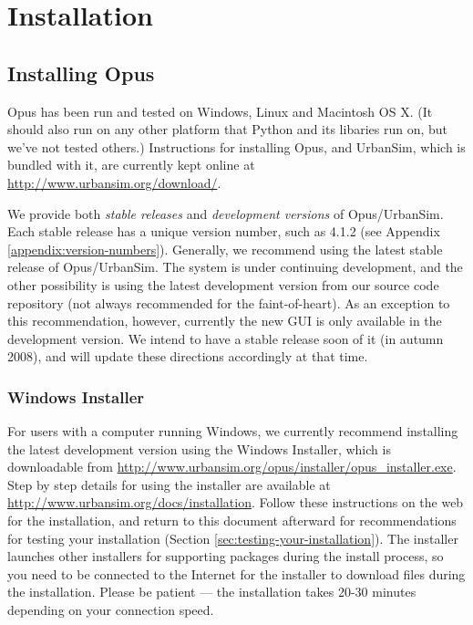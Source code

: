 
\chapter{Installation}
\label{appendix:installation}


\section{Installing Opus}

Opus has been run and tested on Windows, Linux and Macintosh OS X\@.  (It
should also run on any other platform that Python and its libaries run on,
but we've not tested others.)  Instructions for installing Opus, and
UrbanSim, which is bundled with it, are currently kept online at
\url{http://www.urbansim.org/download/}.

We provide both \emph{stable releases} and \emph{development versions} of
Opus/UrbanSim.  Each stable release has a unique version number, such as
4.1.2 (see Appendix \ref{appendix:version-numbers}).
Generally, we recommend using the latest stable release of
Opus/UrbanSim.  The system is under continuing development, and the other
possibility is using the latest development version from our source code
repository (not always recommended for the faint-of-heart).  As an
exception to this recommendation, however, currently the new GUI is only
available in the development version.  We intend to have a stable release
soon of it (in autumn 2008), and will update these directions accordingly
at that time.

\subsection{Windows Installer}

For users with a computer running Windows, we currently recommend
installing the latest development version using the Windows Installer,
which is downloadable from
\url{http://www.urbansim.org/opus/installer/opus_installer.exe}.  Step by
step details for using the installer are available at
\url{http://www.urbansim.org/docs/installation}.  Follow these instructions
on the web for the installation, and return to this document afterward for
recommendations for testing your installation (Section
\ref{sec:testing-your-installation}).  The installer launches other
installers for supporting packages during the install process, so you need
to be connected to the Internet for the installer to download files during
the installation.  Please be patient --- the installation takes 20-30
minutes depending on your connection speed.

